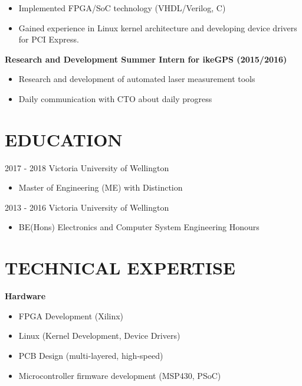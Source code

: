 \documentclass{res}
\begin{document}
\begin{resume}
\begin{itemize}[noitemsep]
      \item Implemented FPGA/SoC technology (VHDL/Verilog, C)
      \item Gained experience in Linux kernel architecture and developing device drivers for PCI Express.
    \end{itemize}
  {\bf Research and Development Summer Intern for ikeGPS (2015/2016)}
    \begin{itemize}[noitemsep] %
      \item Research and development of automated laser measurement tools
      \item Daily communication with CTO about daily progress
    \end{itemize}

\section{EDUCATION}
\vspace{0.1in}

  2017 - 2018 Victoria University of Wellington
  \begin{itemize}
    \item Master of Engineering (ME) with Distinction
  \end{itemize}

  2013 - 2016 Victoria University of Wellington
  \begin{itemize} %
    \item BE(Hons) Electronics and Computer System Engineering Honours
  \end{itemize}

\section{TECHNICAL EXPERTISE}
  {\bf Hardware}
    \begin{itemize}[noitemsep]
      \item FPGA Development (Xilinx)
      \item Linux (Kernel Development, Device Drivers)
      \item PCB Design (multi-layered, high-speed)
      \item Microcontroller firmware development (MSP430, PSoC)
    \end{itemize}


\end{resume}
\end{document}
